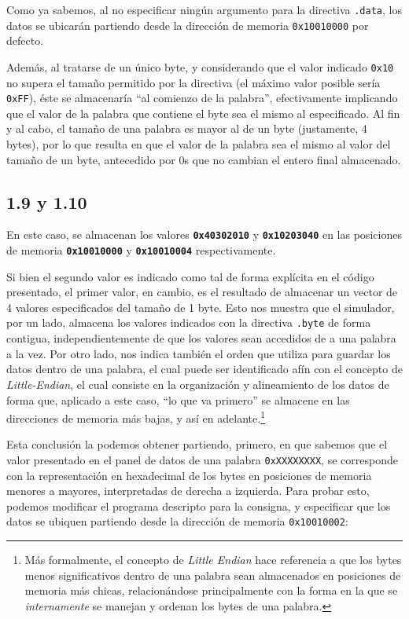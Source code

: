 \documentclass[a4paper]{report}
\begin{document}
Como ya sabemos, al no especificar ningún argumento para la directiva \texttt{.data}, los datos se ubicarán partiendo desde la dirección de memoria \texttt{0x10010000} por defecto.

Además, al tratarse de un único byte, y considerando que el valor indicado \texttt{0x10} no supera el tamaño permitido por la directiva (el máximo valor posible sería \texttt{0xFF}), éste se almacenaría ``al comienzo de la palabra'', efectivamente implicando que el valor de la palabra que contiene el byte sea el mismo al especificado. Al fin y al cabo, el tamaño de una palabra es mayor al de un byte (justamente, 4 bytes), por lo que resulta en que el valor de la palabra sea el mismo al valor del tamaño de un byte, antecedido por 0s que no cambian el entero final almacenado.

\subsection*{1.9 y 1.10}

En este caso, se almacenan los valores \textbf{\texttt{0x40302010}} y \textbf{\texttt{0x10203040}} en las posiciones de memoria \textbf{\texttt{0x10010000}} y \textbf{\texttt{0x10010004}} respectivamente.

Si bien el segundo valor es indicado como tal de forma explícita en el código presentado, el primer valor, en cambio, es el resultado de almacenar un vector de 4 valores especificados del tamaño de 1 byte. Esto nos muestra que el simulador, por un lado, almacena los valores indicados con la directiva \texttt{.byte} de forma contigua, independientemente de que los valores sean accedidos de a una palabra a la vez. Por otro lado, nos indica también el orden que utiliza para guardar los datos dentro de una palabra, el cual puede ser identificado afín con el concepto de \textit{Little-Endian}, el cual consiste en la organización y alineamiento de los datos de forma que, aplicado a este caso, ``lo que va primero'' se almacene en las direcciones de memoria más bajas, y así en adelante.\footnote{Más formalmente, el concepto de \textit{Little Endian} hace referencia a que los bytes menos significativos dentro de una palabra sean almacenados en posiciones de memoria más chicas, relacionándose principalmente con la forma en la que se \textit{internamente} se manejan y ordenan los bytes de una palabra.}

Esta conclusión la podemos obtener partiendo, primero, en que sabemos que el valor presentado en el panel de datos de una palabra \texttt{0xXXXXXXXX}, se corresponde con la representación en hexadecimal de los bytes en posiciones de memoria menores a mayores, interpretadas de derecha a izquierda. Para probar esto, podemos modificar el programa descripto para la consigna, y especificar que los datos se ubiquen partiendo desde la dirección de memoria \texttt{0x10010002}:
\end{document}
